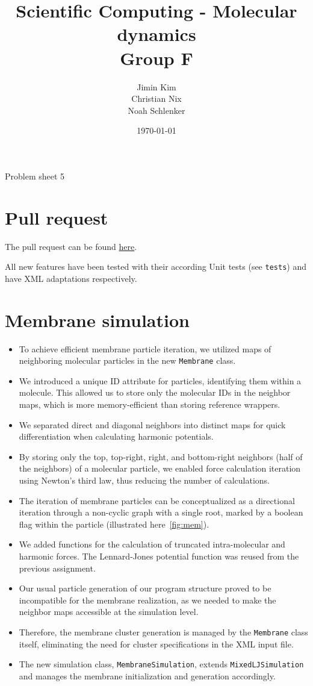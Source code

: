 \documentclass{article}
\title{Scientific Computing - Molecular dynamics \\ Group F}
\author{
    Jimin Kim \\
    Christian Nix \\
    Noah Schlenker
}
\date{\today}
\newcommand{\subtitle}{Problem sheet 5}
\begin{document}
\maketitle

\begin{center}
    \LARGE \subtitle{}
\end{center}

\section{Pull request}
\label{sec:pr}
The pull request can be found \href{https://github.com/noahpy/MolSim-SS24/pull/60}{here}.

All new features have been tested with their according Unit tests (see \texttt{tests}) and have XML adaptations respectively.

\section{Membrane simulation}
\label{sec:mem}

    \begin{itemize}
        \item To achieve efficient membrane particle iteration, we utilized maps of neighboring molecular particles in the new \texttt{Membrane} class.
        \item We introduced a unique ID attribute for particles, identifying them within a molecule. This allowed us to store only the molecular IDs in the neighbor maps, which is more memory-efficient than storing reference wrappers.
        \item We separated direct and diagonal neighbors into distinct maps for quick differentiation when calculating harmonic potentials.
        \item By storing only the top, top-right, right, and bottom-right neighbors (half of the neighbors) of a molecular particle, we enabled force calculation iteration using Newton's third law, thus reducing the number of calculations.
        \item The iteration of membrane particles can be conceptualized as a directional iteration through a non-cyclic graph with a single root, marked by a boolean flag within the particle (illustrated here\ \ref{fig:mem}).
        \item We added functions for the calculation of truncated intra-molecular and harmonic forces. The Lennard-Jones potential function was reused from the previous assignment.
        \item Our usual particle generation of our program structure proved to be incompatible for the membrane realization, as we needed to make the neighbor maps accessible at the simulation level.
        \item Therefore, the membrane cluster generation is managed by the \texttt{Membrane} class itself, eliminating the need for cluster specifications in the XML input file.
        \item The new simulation class, \texttt{MembraneSimulation}, extends \texttt{MixedLJSimulation} and manages the membrane initialization and generation accordingly.
    \end{itemize}
\end{document}

